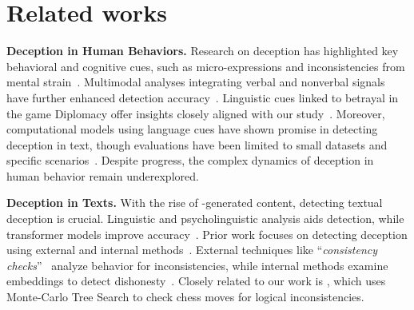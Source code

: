 \section{Related works}
\textbf{Deception in Human Behaviors.}
Research on deception has highlighted key behavioral and cognitive cues, such as micro-expressions and inconsistencies from mental strain~\cite{ekman2003, vrij2008}. Multimodal analyses integrating verbal and nonverbal signals have further enhanced detection accuracy~\cite{depaulo2003}. Linguistic cues linked to betrayal in the game Diplomacy offer insights closely aligned with our study~\cite{niculae-etal-2015-linguistic}. 
Moreover, computational models using language cues have shown promise in detecting deception in text, though evaluations have been limited to small datasets and specific scenarios~\cite{deception_algorithm, hazra-majumder-2024-tell}. Despite progress, the complex dynamics of deception in human behavior remain underexplored.

\textbf{ Deception in Texts.}
With the rise of -generated content, detecting textual deception is crucial. Linguistic and psycholinguistic analysis aids detection, while transformer models improve accuracy~\cite{ott2011, perozosas2015, zhang2019}.
Prior work focuses on detecting  deception using external and internal methods~\cite{park2024ai}. External techniques like ``\textit{consistency checks}''~\cite{fluri2024evaluating} analyze  behavior for inconsistencies, while internal methods examine embeddings to detect dishonesty~\cite{azaria-mitchell-2023-internal, burns2024discoveringlatentknowledgelanguage}. Closely related to our work is \citet{fluri2024evaluating}, which uses Monte-Carlo Tree Search to check chess moves for logical inconsistencies.



